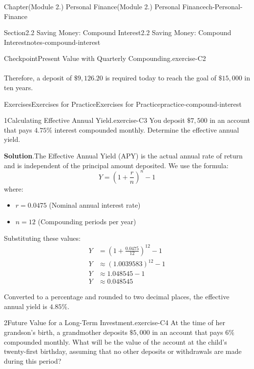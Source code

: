 \documentclass[oneside,10pt,]{book}
\newcommand{\blocktitlefont}{\relax}
\newcommand{\ptxlistdisc}{\raisebox{0.3ex}{\textbullet}}
\newcommand{\amp}{&}
\begin{document}
\begin{chapterptx}{Chapter}{(Module 2.) Personal Finance}{}{(Module 2.) Personal Finance}{}{}{ch-Personal-Finance}
\begin{sectionptx}{Section}{2.2 Saving Money: Compound Interest}{}{2.2 Saving Money: Compound Interest}{}{}{notes-compound-interest}
\begin{inlineexercise}{Checkpoint}{Present Value with Quarterly Compounding.}{exercise-C2}
\begin{align*}
\end{align*}
%
\par
Therefore, a deposit of \(\$9,126.20\) is required today to reach the goal of \(\$15,000\) in ten years.%
\end{inlineexercise}%
%
%
\typeout{************************************************}
\typeout{************************************************}
%
\begin{exercises-subsection-numberless}{Exercises}{Exercises for Practice}{}{Exercises for Practice}{}{}{practice-compound-interest}
\begin{divisionexercise}{1}{Calculating Effective Annual Yield.}{}{exercise-C3}%
You deposit \(\$7,500\) in an account that pays \(4.75\%\) interest compounded monthly. Determine the effective annual yield.%
\par\smallskip%
\noindent\textbf{\blocktitlefont Solution}.\hypertarget{exercise-C3-3}{}\quad{}The Effective Annual Yield (APY) is the actual annual rate of return and is independent of the principal amount deposited. We use the formula:%
\begin{equation*}
Y = \left(1 + \frac{r}{n}\right)^n - 1
\end{equation*}
where:%
\begin{itemize}[label=\ptxlistdisc]
\item{}\(r = 0.0475\) (Nominal annual interest rate)%
\item{}\(n = 12\) (Compounding periods per year)%
\end{itemize}
%
\par
Substituting these values:%
\begin{align*}
Y \amp = \left(1 + \frac{0.0475}{12}\right)^{12} - 1\\
Y \amp \approx (1.0039583)^{12} - 1\\
Y \amp \approx 1.048545 - 1\\
Y \amp \approx 0.048545
\end{align*}
%
\par
Converted to a percentage and rounded to two decimal places, the effective annual yield is \(4.85\%\).%
\end{divisionexercise}%
\begin{divisionexercise}{2}{Future Value for a Long-Term Investment.}{}{exercise-C4}%
At the time of her grandson's birth, a grandmother deposits \(\$5,000\) in an account that pays \(6\%\) compounded monthly. What will be the value of the account at the child's twenty-first birthday, assuming that no other deposits or withdrawals are made during this period?%

\end{divisionexercise}
\end{exercises-subsection-numberless}
\end{sectionptx}
\end{chapterptx}
\end{document}
